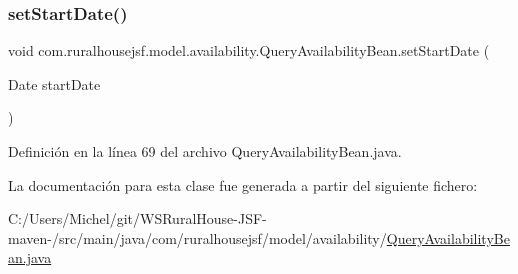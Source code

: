 \subsubsection{\texorpdfstring{setStartDate()}{setStartDate()}}
{\footnotesize\ttfamily void com.\+ruralhousejsf.\+model.\+availability.\+Query\+Availability\+Bean.\+set\+Start\+Date (\begin{DoxyParamCaption}\item[{Date}]{start\+Date }\end{DoxyParamCaption})}



Definición en la línea 69 del archivo Query\+Availability\+Bean.\+java.



La documentación para esta clase fue generada a partir del siguiente fichero\+:\begin{DoxyCompactItemize}
\item 
C\+:/\+Users/\+Michel/git/\+W\+S\+Rural\+House-\/\+J\+S\+F-\/maven-\//src/main/java/com/ruralhousejsf/model/availability/\mbox{\hyperlink{_query_availability_bean_8java}{Query\+Availability\+Bean.\+java}}\end{DoxyCompactItemize}
